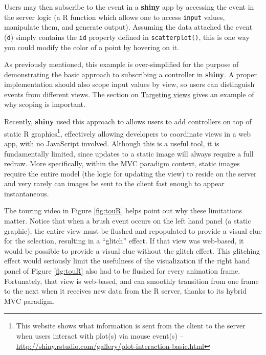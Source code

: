 \documentclass[12pt,]{isuthesis}
\newenvironment{Shaded}{\begin{snugshade}}{\end{snugshade}}
\newcommand{\KeywordTok}[1]{\textcolor[rgb]{0.13,0.29,0.53}{\textbf{{#1}}}}
\newcommand{\DataTypeTok}[1]{\textcolor[rgb]{0.13,0.29,0.53}{{#1}}}
\newcommand{\DecValTok}[1]{\textcolor[rgb]{0.00,0.00,0.81}{{#1}}}
\newcommand{\StringTok}[1]{\textcolor[rgb]{0.31,0.60,0.02}{{#1}}}
\newcommand{\NormalTok}[1]{{#1}}
\let\rmarkdownfootnote\footnote%
\def\footnote{\protect\rmarkdownfootnote}
\begin{document}
Users may then subscribe to the event in a \textbf{shiny} app by
accessing the event in the server logic (a R function which allows one
to access \texttt{input} values, manipulate them, and generate output).
Assuming the data attached the event (\texttt{d}) simply contains the
\texttt{id} property defined in \texttt{scatterplot()}, this is one way
you could modify the color of a point by hovering on it.

\begin{Shaded}
\end{Shaded}

As previously mentioned, this example is over-simplified for the purpose
of demonstrating the basic approach to subscribing a controller in
\textbf{shiny}. A proper implementation should also scope input values
by view, so users can distinguish events from different views. The
section on \protect\hyperlink{targeting-views}{Targeting views} gives an
example of why scoping is important.

Recently, \textbf{shiny} used this approach to allows users to add
controllers on top of static R graphics\footnote{This website shows what
  information is sent from the client to the server when users interact
  with plot(s) via mouse event(s) --
  \url{http://shiny.rstudio.com/gallery/plot-interaction-basic.html}},
effectively allowing developers to coordinate views in a web app, with
no JavaScript involved. Although this is a useful tool, it is
fundamentally limited, since updates to a static image will always
require a full redraw. More specifically, within the MVC paradigm
context, static images require the entire model (the logic for updating
the view) to reside on the server and very rarely can images be sent to
the client fast enough to appear instantaneous.

The touring video in Figure \ref{fig:touR} helps point out why these
limitations matter. Notice that when a brush event occurs on the left
hand panel (a static graphic), the entire view must be flushed and
repopulated to provide a visual clue for the selection, resulting in a
``glitch'' effect. If that view was web-based, it would be possible to
provide a visual clue without the glitch effect. This glitching effect
would seriously limit the usefulness of the visualization if the right
hand panel of Figure \ref{fig:touR} also had to be flushed for every
animation frame. Fortunately, that view is web-based, and can smoothly
transition from one frame to the next when it receives new data from the
R server, thanks to its hybrid MVC paradigm.
\end{document}
